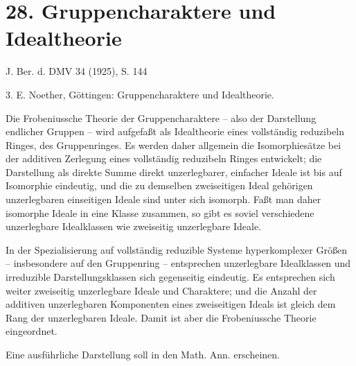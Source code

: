 ﻿\section*{28. Gruppencharaktere und Idealtheorie}

\begin{center}
J. Ber. d. DMV 34 (1925), S. 144
\end{center}

3. E. Noether, Göttingen: Gruppencharaktere und Idealtheorie.

Die Frobeniussche Theorie der Gruppencharaktere -- also der Darstellung endlicher Gruppen -- wird aufgefaßt als Idealtheorie eines vollständig reduzibeln Ringes, des Gruppenringes. Es werden daher allgemein die Isomorphiesätze bei der additiven Zerlegung eines vollständig reduzibeln Ringes entwickelt; die Darstellung als direkte Summe direkt unzerlegbarer, einfacher Ideale ist bis auf Isomorphie eindeutig, und die zu demselben zweiseitigen Ideal gehörigen unzerlegbaren einseitigen Ideale sind unter sich isomorph. Faßt man daher isomorphe Ideale in eine Klasse zusammen, so gibt es soviel verschiedene unzerlegbare Idealklassen wie zweiseitig unzerlegbare Ideale.

In der Spezialisierung auf vollständig reduzible Systeme hyperkomplexer Größen -- insbesondere auf den Gruppenring -- entsprechen unzerlegbare Idealklassen und irreduzible Darstellungsklassen sich gegenseitig eindeutig. Es entsprechen sich weiter zweiseitig unzerlegbare Ideale und Charaktere; und die Anzahl der additiven unzerlegbaren Komponenten eines zweiseitigen Ideals ist gleich dem Rang der unzerlegbaren Ideale. Damit ist aber die Frobeniussche Theorie eingeordnet.

Eine ausführliche Darstellung soll in den Math. Ann. erscheinen.

